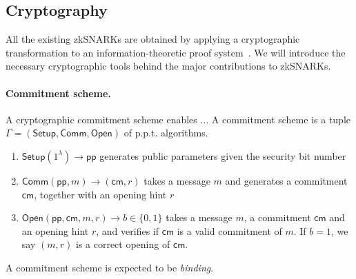 \documentclass[acmtog]{acmart}
\newcommand{\Setup}{\mathsf{Setup}}
\newcommand{\Prove}{\mathsf{Prove}}
\newcommand{\Verify}{\mathsf{Verify}}
\newcommand{\Comm}{\mathsf{Comm}}
\newcommand{\Open}{\mathsf{Open}}
\newcommand{\pp}{\mathsf{pp}}
\newcommand{\cm}{\mathsf{cm}}
\begin{document}

\subsection{Cryptography}

All the existing zkSNARKs are obtained by applying a cryptographic transformation to an information-theoretic proof system~\cite{ZKProof20}.
We will introduce the necessary cryptographic tools behind the major contributions to zkSNARKs.

\paragraph{Commitment scheme.}
A cryptographic commitment scheme enables ...
A commitment scheme is a tuple $\Gamma=(\Setup, \Comm, \Open)$ of p.p.t. algorithms.
\begin{enumerate}
	\item $\Setup(1^{\lambda})\to\pp$ generates public parameters given the security bit number
	\item $\Comm(\pp,m)\to(\cm,r)$ takes a message $m$ and generates a commitment $\cm$, together with an opening hint $r$
	\item $\Open(\pp,\cm,m,r)\to b\in\{0,1\}$ takes a message $m$, a commitment $\cm$ and an opening hint $r$, and verifies if $\cm$ is a valid commitment of $m$.
	If $b=1$, we say $(m,r)$ is a correct opening of $\cm$.
\end{enumerate}
A commitment scheme is expected to be \emph{binding}.
\end{document}
